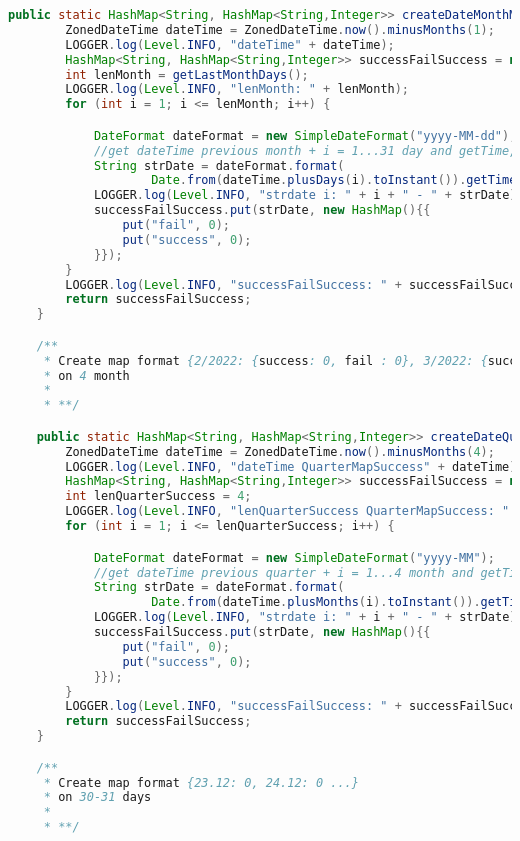 \begin{lstlisting}[language=Java]
    public static HashMap<String, HashMap<String,Integer>> createDateMonthMapSuccessRate() {
        ZonedDateTime dateTime = ZonedDateTime.now().minusMonths(1);
        LOGGER.log(Level.INFO, "dateTime" + dateTime);
        HashMap<String, HashMap<String,Integer>> successFailSuccess = new HashMap();
        int lenMonth = getLastMonthDays();
        LOGGER.log(Level.INFO, "lenMonth: " + lenMonth);
        for (int i = 1; i <= lenMonth; i++) {

            DateFormat dateFormat = new SimpleDateFormat("yyyy-MM-dd");
            //get dateTime previous month + i = 1...31 day and getTime, after in strDate=2022-03-22
            String strDate = dateFormat.format(
                    Date.from(dateTime.plusDays(i).toInstant()).getTime());
            LOGGER.log(Level.INFO, "strdate i: " + i + " - " + strDate);
            successFailSuccess.put(strDate, new HashMap(){{
                put("fail", 0);
                put("success", 0);
            }});
        }
        LOGGER.log(Level.INFO, "successFailSuccess: " + successFailSuccess.entrySet());
        return successFailSuccess;
    }

    /**
     * Create map format {2/2022: {success: 0, fail : 0}, 3/2022: {success: 0, fail : 0} ...}
     * on 4 month
     *
     * **/

    public static HashMap<String, HashMap<String,Integer>> createDateQuarterMapSuccessRate() {
        ZonedDateTime dateTime = ZonedDateTime.now().minusMonths(4);
        LOGGER.log(Level.INFO, "dateTime QuarterMapSuccess" + dateTime);
        HashMap<String, HashMap<String,Integer>> successFailSuccess = new HashMap();
        int lenQuarterSuccess = 4;
        LOGGER.log(Level.INFO, "lenQuarterSuccess QuarterMapSuccess: " + lenQuarterSuccess);
        for (int i = 1; i <= lenQuarterSuccess; i++) {

            DateFormat dateFormat = new SimpleDateFormat("yyyy-MM");
            //get dateTime previous quarter + i = 1...4 month and getTime, after in strDate=2022-03
            String strDate = dateFormat.format(
                    Date.from(dateTime.plusMonths(i).toInstant()).getTime());
            LOGGER.log(Level.INFO, "strdate i: " + i + " - " + strDate);
            successFailSuccess.put(strDate, new HashMap(){{
                put("fail", 0);
                put("success", 0);
            }});
        }
        LOGGER.log(Level.INFO, "successFailSuccess: " + successFailSuccess.entrySet());
        return successFailSuccess;
    }

    /**
     * Create map format {23.12: 0, 24.12: 0 ...}
     * on 30-31 days
     *
     * **/


\end{lstlisting}
